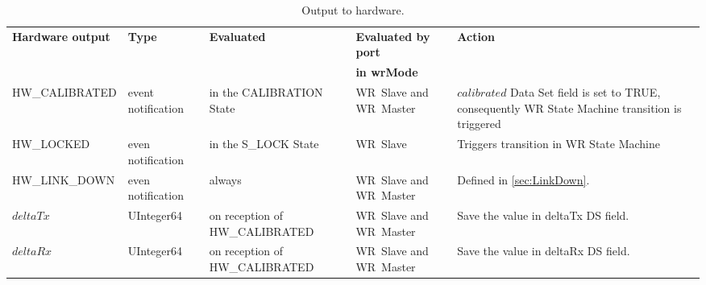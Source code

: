 \documentclass[a4paper, 12pt]{article}
\begin{document}
\begin{table}[ht!]
\caption{Output to hardware.}
\centering
\begin{tabular}{| p{5.1cm} | p{2cm} | p{3.5cm} | p{1.7cm} | p{2.4cm} |}          \hline

\textbf{Hardware output}
            &\textbf{Type}& \textbf{Evaluated}    & \textbf{Evaluated by port} & \textbf{Action} \\ 
            &             &         	          & \textbf{in wrMode}         &           \\ \hline
\small
HW\_CALIBRATED\footnotemark[7]
		& event notification    & in the CALIBRATION 
			    State		  & WR~Slave and WR~Master& $calibrated$ Data Set field is set to TRUE, consequently WR State Machine transition is triggered\\ \hline
HW\_LOCKED      & even notification     & in the S\_LOCK State   & WR~Slave& Triggers transition in WR State Machine\\ \hline
HW\_LINK\_DOWN  & even notification     & always   & WR~Slave and WR~Master & Defined in \ref{sec:LinkDown}.\\ \hline
$deltaTx$\footnotemark[7]
		& UInteger64~\footnotemark[8]  & on reception of 
                            HW\_CALIBRATED        & WR~Slave and WR~Master& Save the value in deltaTx DS field.\\ \hline
$deltaRx$\footnotemark[7]
		& UInteger64~\footnotemark[8]  & on reception of 
                            HW\_CALIBRATED        & WR~Slave and WR~Master& Save the value in deltaRx DS field. \\ \hline


\end{tabular}
\label{tab:outputWrCommWithHW}
\end{table}
\end{document}

